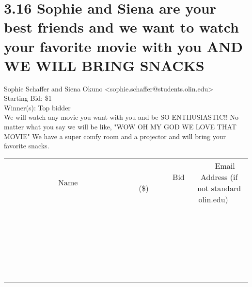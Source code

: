 \documentclass[11pt]{article}
\begin{document}
					\section*{3.16 Sophie and Siena are your best friends and we want to watch your favorite movie with you AND WE WILL BRING SNACKS}
					Sophie  Schaffer and Siena Okuno <sophie.schaffer@students.olin.edu> \\
					Starting Bid: \$1 \\
					Winner(s): Top bidder \\
					We will watch any movie you want with you and be SO ENTHUSIASTIC!! No matter what you say we will be like, "WOW OH MY GOD WE LOVE THAT MOVIE" We have a super comfy room and a projector and will bring your favorite snacks. \\
					[6ex]
					\begin{tabular}{c c c}
						~~~~~~~~~~~~~Name~~~~~~~~~~~~~ & ~~~~~~~~~Bid (\$)~~~~~~~~~ & ~~~Email Address (if not standard olin.edu)~~~ \\
				
 & & \\
\hline
 & & \\
\hline
 & & \\
\hline
 & & \\
\hline
 & & \\
\hline
 & & \\
\hline
 & & \\
\hline
 & & \\
\hline
 & & \\
\hline
 & & \\
\hline
 & & \\
\hline
 & & \\
\hline
 & & \\
\hline
 & & \\
\hline
 & & \\
\hline
 & & \\
\hline
 & & \\
\hline
 & & \\
\hline
 & & \\
\hline
 & & \\
\hline
 & & \\
\hline
 & & \\
\hline
 & & \\
\hline
 & & \\
\hline
 & & \\
\hline
 & & \\
\hline
					\end{tabular}
					\clearpage
				
\end{document}
